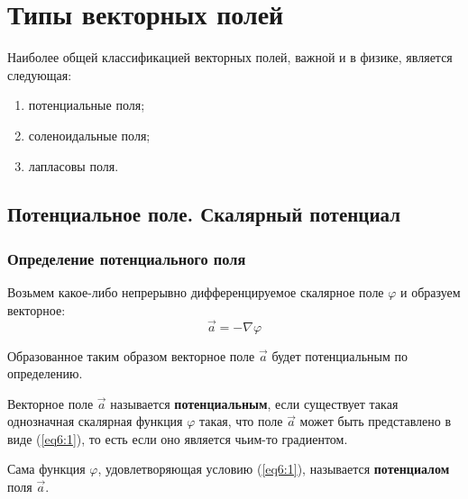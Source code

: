 \section{Типы векторных полей}

	Наиболее общей классификацией векторных полей, важной и в физике, является следующая:
	\begin{enumerate}
	\item
		потенциальные поля;
	\item
		соленоидальные поля;
	\item
		лапласовы поля.
	\end{enumerate}

\subsection{Потенциальное поле. Скалярный потенциал}

\subsubsection{Определение потенциального поля}

	Возьмем какое-либо непрерывно дифференцируемое скалярное поле \( \varphi \) и образуем векторное:
	\begin{equation}
		\vec{a} = -\nabla\varphi \label{eq6:1}
	\end{equation}
	
	Образованное таким образом векторное поле \( \vec{a} \) будет потенциальным по определению.
	
	\begin{definition}
	Векторное поле \( \vec{a} \) называется \textbf{потенциальным}, если существует такая однозначная скалярная функция \( \varphi \) такая, что поле \( \vec{a} \) может быть представлено в виде (\ref{eq6:1}), то есть если оно является чьим-то градиентом.
	
	Сама функция \( \varphi \), удовлетворяющая условию (\ref{eq6:1}), называется \textbf{потенциалом} поля \( \vec{a} \).
	\end{definition}
	
